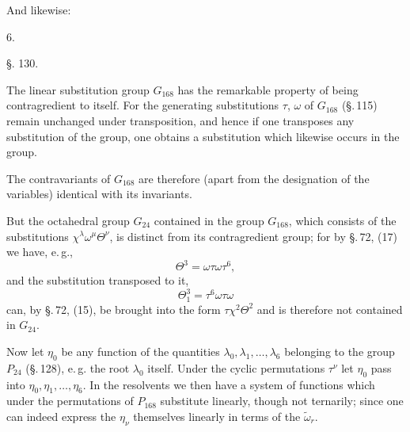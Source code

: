 
And likewise:

6. 

\begin{center}
\S. 130.

\end{center}

The linear substitution group $G_{168}$ has the remarkable property of being contragredient to itself. For the generating substitutions $\tau$, $\omega$ of $G_{168}$ (\S.\,115) remain unchanged under transposition, and hence if one transposes any substitution of the group, one obtains a substitution which likewise occurs in the group.

The contravariants of $G_{168}$ are therefore (apart from the designation of the variables) identical with its invariants.

But the octahedral group $G_{24}$ contained in the group $G_{168}$, which consists of the substitutions $\chi^\lambda\omega^\mu\Theta^\nu$, is distinct from its contragredient group; for by \S.\,72, (17) we have, e.\,g.,
\[
\Theta^3 = \omega\tau\omega\tau^6,
\]
and the substitution transposed to it,
\[
\Theta_1^3 = \tau^6\omega\tau\omega
\]
can, by \S.\,72, (15), be brought into the form $\tau\chi^2\Theta^2$ and is therefore not contained in $G_{24}$.

Now let $\eta_0$ be any function of the quantities $\lambda_0, \lambda_1, \ldots, \lambda_6$ belonging to the group $P_{24}$ (\S.\,128), e.\,g. the root $\lambda_0$ itself. Under the cyclic permutations $\tau^\nu$ let $\eta_0$ pass into $\eta_0, \eta_1, \ldots, \eta_6$. In the resolvents
we then have a system of functions which under the permutations of $P_{168}$ substitute linearly, though not ternarily; since one can indeed express the $\eta_\nu$ themselves linearly in terms of the $\tilde\omega_r$.

